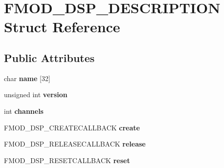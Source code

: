 \hypertarget{struct_f_m_o_d___d_s_p___d_e_s_c_r_i_p_t_i_o_n}{}\section{F\+M\+O\+D\+\_\+\+D\+S\+P\+\_\+\+D\+E\+S\+C\+R\+I\+P\+T\+I\+ON Struct Reference}
\label{struct_f_m_o_d___d_s_p___d_e_s_c_r_i_p_t_i_o_n}
\subsection*{Public Attributes}
\begin{DoxyCompactItemize}
\item 
char {\bfseries name} \mbox{[}32\mbox{]}\hypertarget{struct_f_m_o_d___d_s_p___d_e_s_c_r_i_p_t_i_o_n_a936bbb2616344ea745f21fcb86201497}{}\label{struct_f_m_o_d___d_s_p___d_e_s_c_r_i_p_t_i_o_n_a936bbb2616344ea745f21fcb86201497}

\item 
unsigned int {\bfseries version}\hypertarget{struct_f_m_o_d___d_s_p___d_e_s_c_r_i_p_t_i_o_n_a2b39be891bd32c184883a673348bd29a}{}\label{struct_f_m_o_d___d_s_p___d_e_s_c_r_i_p_t_i_o_n_a2b39be891bd32c184883a673348bd29a}

\item 
int {\bfseries channels}\hypertarget{struct_f_m_o_d___d_s_p___d_e_s_c_r_i_p_t_i_o_n_a6d8bbb62ed1b5bd7a5a90b6e3687360d}{}\label{struct_f_m_o_d___d_s_p___d_e_s_c_r_i_p_t_i_o_n_a6d8bbb62ed1b5bd7a5a90b6e3687360d}

\item 
F\+M\+O\+D\+\_\+\+D\+S\+P\+\_\+\+C\+R\+E\+A\+T\+E\+C\+A\+L\+L\+B\+A\+CK {\bfseries create}\hypertarget{struct_f_m_o_d___d_s_p___d_e_s_c_r_i_p_t_i_o_n_ab5425909d6162252d06da751ffc971ed}{}\label{struct_f_m_o_d___d_s_p___d_e_s_c_r_i_p_t_i_o_n_ab5425909d6162252d06da751ffc971ed}

\item 
F\+M\+O\+D\+\_\+\+D\+S\+P\+\_\+\+R\+E\+L\+E\+A\+S\+E\+C\+A\+L\+L\+B\+A\+CK {\bfseries release}\hypertarget{struct_f_m_o_d___d_s_p___d_e_s_c_r_i_p_t_i_o_n_a39af498cf54ff7d6f7dd8ffbaaf238d7}{}\label{struct_f_m_o_d___d_s_p___d_e_s_c_r_i_p_t_i_o_n_a39af498cf54ff7d6f7dd8ffbaaf238d7}

\item 
F\+M\+O\+D\+\_\+\+D\+S\+P\+\_\+\+R\+E\+S\+E\+T\+C\+A\+L\+L\+B\+A\+CK {\bfseries reset}\hypertarget{struct_f_m_o_d___d_s_p___d_e_s_c_r_i_p_t_i_o_n_a837aca99489149f6eb46cfa4da0a03c9}{}\label{struct_f_m_o_d___d_s_p___d_e_s_c_r_i_p_t_i_o_n_a837aca99489149f6eb46cfa4da0a03c9}


\end{DoxyCompactItemize}

